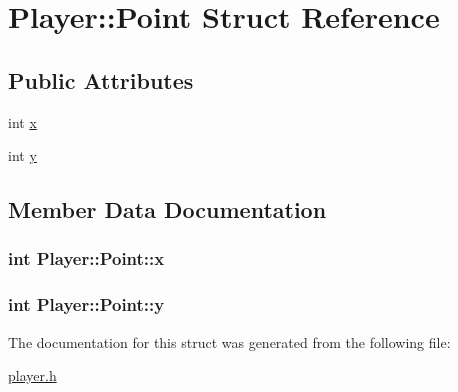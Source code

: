 \hypertarget{structPlayer_1_1Point}{}\section{Player\+:\+:Point Struct Reference}
\label{structPlayer_1_1Point}
\subsection*{Public Attributes}
\begin{DoxyCompactItemize}
\item 
int \hyperlink{structPlayer_1_1Point_a1619bb16a0cdb4723438a6cdbed54e00}{x}
\item 
int \hyperlink{structPlayer_1_1Point_a129709b68541e696410b3f8ae189c129}{y}
\end{DoxyCompactItemize}


\subsection{Member Data Documentation}
\hypertarget{structPlayer_1_1Point_a1619bb16a0cdb4723438a6cdbed54e00}{}
\subsubsection[{x}]{\setlength{\rightskip}{0pt plus 5cm}int Player\+::\+Point\+::x}\label{structPlayer_1_1Point_a1619bb16a0cdb4723438a6cdbed54e00}
\hypertarget{structPlayer_1_1Point_a129709b68541e696410b3f8ae189c129}{}
\subsubsection[{y}]{\setlength{\rightskip}{0pt plus 5cm}int Player\+::\+Point\+::y}\label{structPlayer_1_1Point_a129709b68541e696410b3f8ae189c129}


The documentation for this struct was generated from the following file\+:\begin{DoxyCompactItemize}
\item 
\hyperlink{player_8h}{player.\+h}\end{DoxyCompactItemize}
